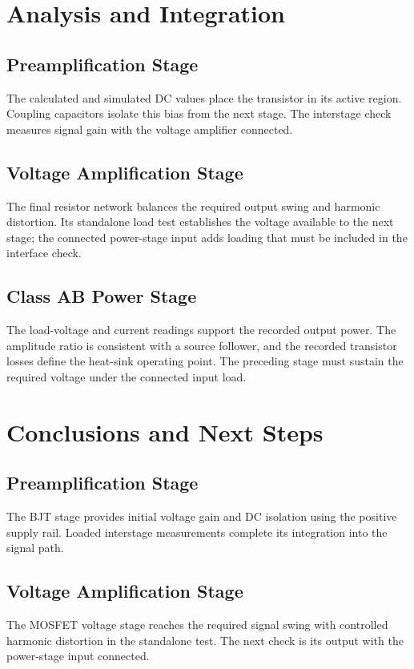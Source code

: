 \documentclass[conference,letterpaper]{IEEEtran}
\begin{document}
\section{Analysis and Integration}
\subsection{Preamplification Stage}
The calculated and simulated DC values place the transistor in its
active region. Coupling capacitors isolate this bias from the next
stage. The interstage check measures signal gain with the voltage
amplifier connected.

\subsection{Voltage Amplification Stage}
The final resistor network balances the required output swing and
harmonic distortion. Its standalone load test establishes the voltage
available to the next stage; the connected power-stage input adds
loading that must be included in the interface check.

\subsection{Class AB Power Stage}
The load-voltage and current readings support the recorded output
power. The amplitude ratio is consistent with a source follower,
and the recorded transistor losses define the heat-sink operating point.
The preceding stage must sustain the required voltage under the
connected input load.

\section{Conclusions and Next Steps}
\subsection{Preamplification Stage}
The BJT stage provides initial voltage gain and DC isolation using
the positive supply rail. Loaded interstage measurements complete
its integration into the signal path.

\subsection{Voltage Amplification Stage}
The MOSFET voltage stage reaches the required signal swing with
controlled harmonic distortion in the standalone test. The next
check is its output with the power-stage input connected.
\end{document}
